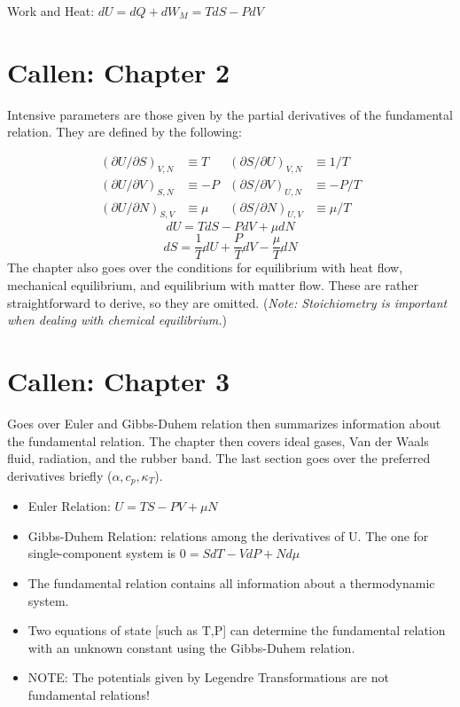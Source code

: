 Work and Heat: $dU = dQ + dW_M = TdS - PdV$

\section{Callen: Chapter 2}

Intensive parameters are those given by the partial derivatives of the fundamental relation. They are defined by the following:

\begin{align*}
    (\partial U/\partial S)_{V,N} & \equiv  T & (\partial S/\partial U)_{V,N} & \equiv  1/T \\ 
    (\partial U/\partial V)_{S,N} & \equiv -P & (\partial S/\partial V)_{U,N} & \equiv -P/T \\ 
    (\partial U/\partial N)_{S,V} & \equiv \mu & (\partial S/\partial N)_{U,V} & \equiv \mu/T
\end{align*}
\begin{equation}
    dU = TdS-PdV+\mu dN
\end{equation}
\begin{equation}
    dS = \frac{1}{T} dU + \frac{P}{T} dV - \frac{\mu}{T} dN
\end{equation}
The chapter also goes over the conditions for equilibrium with heat flow, mechanical equilibrium, and equilibrium with matter flow. These are rather straightforward to derive, so they are omitted. (\emph{Note: Stoichiometry is important when dealing with chemical equilibrium.})

\section{Callen: Chapter 3}
Goes over Euler and Gibbs-Duhem relation then summarizes information about the fundamental relation. The chapter then covers ideal gases, Van der Waals fluid, radiation, and the rubber band. The last section goes over the preferred derivatives briefly ($\alpha, c_p, \kappa_T$).
\begin{itemize}
    \item Euler Relation: $U=TS-PV+\mu N$
    \item Gibbs-Duhem Relation: relations among the derivatives of U. The one for single-component system is $0 = S dT - V dP + N d\mu $
    \item The fundamental relation contains all information about a thermodynamic system.
    \item Two equations of state [such as T,P] can determine the fundamental relation with an unknown constant using the Gibbs-Duhem relation.
    \item NOTE: The potentials given by Legendre Transformations are not fundamental relations!
\end{itemize}


